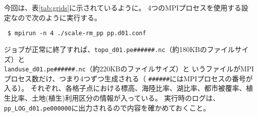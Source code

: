 今回は、表\ref{tab:grids}に示されているように。
4つのMPIプロセスを使用する設定なので次のように実行する。
\begin{verbatim}
 $ mpirun -n 4 ./scale-rm_pp pp.d01.conf
\end{verbatim}
ジョブが正常に終了すれば、\verb|topo_d01.pe######.nc|（約180KBのファイルサイズ）と\\
\verb|landuse_d01.pe######.nc|（約220KBのファイルサイズ）と
いうファイルがMPIプロセス数だけ、つまり4つずつ生成される（
\verb|######|にはMPIプロセスの番号が入る）。
それぞれ、各格子点における標高、海陸比率、湖比率、都市被覆率、植生比率、土地(植生)利用区分の情報が入っている。
実行時のログは、\verb|pp_LOG_d01.pe000000|に出力されるので内容を確かめておくこと。



